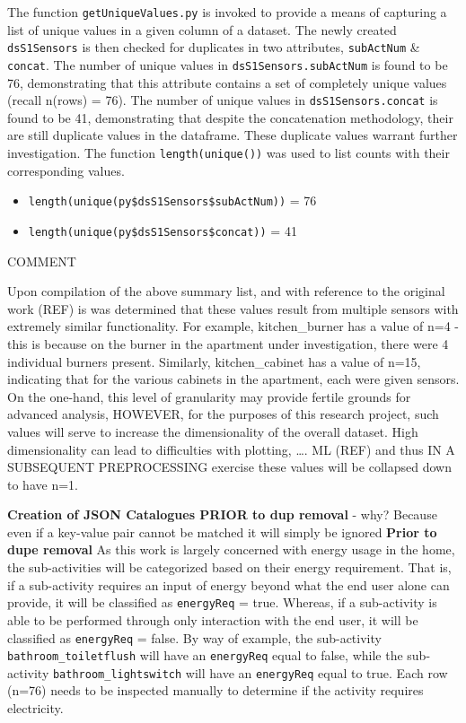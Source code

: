 \documentclass[11pt,]{article}
\providecommand{\tightlist}{%
  \setlength{\itemsep}{0pt}\setlength{\parskip}{0pt}}
\begin{document}
The function \texttt{getUniqueValues.py} is invoked to provide a means
of capturing a list of unique values in a given column of a dataset. The
newly created \texttt{dsS1Sensors} is then checked for duplicates in two
attributes, \texttt{subActNum} \& \texttt{concat}. The number of unique
values in \texttt{dsS1Sensors.subActNum} is found to be 76,
demonstrating that this attribute contains a set of completely unique
values (recall n(rows) = 76). The number of unique values in
\texttt{dsS1Sensors.concat} is found to be 41, demonstrating that
despite the concatenation methodology, their are still duplicate values
in the dataframe. These duplicate values warrant further investigation.
The function \texttt{length(unique())} was used to list counts with
their corresponding values.

\begin{itemize}
\tightlist
\item
  \texttt{length(unique(py\$dsS1Sensors\$subActNum))} = 76
\item
  \texttt{length(unique(py\$dsS1Sensors\$concat))} = 41
\end{itemize}

COMMENT

Upon compilation of the above summary list, and with reference to the
original work (REF) is was determined that these values result from
multiple sensors with extremely similar functionality. For example,
kitchen\_burner has a value of n=4 - this is because on the burner in
the apartment under investigation, there were 4 individual burners
present. Similarly, kitchen\_cabinet has a value of n=15, indicating
that for the various cabinets in the apartment, each were given sensors.
On the one-hand, this level of granularity may provide fertile grounds
for advanced analysis, HOWEVER, for the purposes of this research
project, such values will serve to increase the dimensionality of the
overall dataset. High dimensionality can lead to difficulties with
plotting, \ldots. ML (REF) and thus IN A SUBSEQUENT PREPROCESSING
exercise these values will be collapsed down to have n=1.

\textbf{Creation of JSON Catalogues PRIOR to dup removal} - why? Because
even if a key-value pair cannot be matched it will simply be ignored
\textbf{Prior to dupe removal} As this work is largely concerned with
energy usage in the home, the sub-activities will be categorized based
on their energy requirement. That is, if a sub-activity requires an
input of energy beyond what the end user alone can provide, it will be
classified as \texttt{energyReq} = true. Whereas, if a sub-activity is
able to be performed through only interaction with the end user, it will
be classified as \texttt{energyReq} = false. By way of example, the
sub-activity \texttt{bathroom\_toiletflush} will have an
\texttt{energyReq} equal to false, while the sub-activity
\texttt{bathroom\_lightswitch} will have an \texttt{energyReq} equal to
true. Each row (n=76) needs to be inspected manually to determine if the
activity requires electricity.
\end{document}
